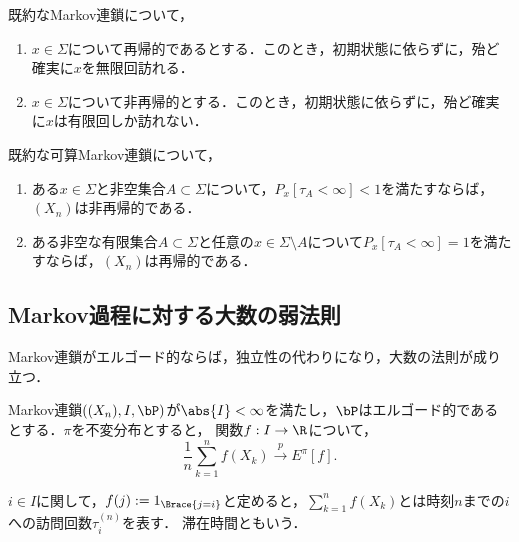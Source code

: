 \documentclass[uplatex,dvipdfmx]{jsreport}
\begin{document}
\begin{proposition}\mbox{}
    既約なMarkov連鎖について，
    \begin{enumerate}
        \item $x\in\Sigma$について再帰的であるとする．このとき，初期状態に依らずに，殆ど確実に$x$を無限回訪れる．
        \item $x\in\Sigma$について非再帰的とする．このとき，初期状態に依らずに，殆ど確実に$x$は有限回しか訪れない．
    \end{enumerate}
\end{proposition}

\begin{proposition}
    既約な可算Markov連鎖について，
    \begin{enumerate}
        \item ある$x\in\Sigma$と非空集合$A\subset\Sigma$について，$P_x[\tau_A<\infty]<1$を満たすならば，$(X_n)$は非再帰的である．
        \item ある非空な有限集合$A\subset\Sigma$と任意の$x\in\Sigma\setminus A$について$P_x[\tau_A<\infty]=1$を満たすならば，$(X_n)$は再帰的である．
    \end{enumerate}
\end{proposition}

\subsection{Markov過程に対する大数の弱法則}

\begin{tcolorbox}[colframe=ForestGreen, colback=ForestGreen!10!white,breakable,colbacktitle=ForestGreen!40!white,coltitle=black,fonttitle=\bfseries\sffamily,
title=]
    Markov連鎖がエルゴード的ならば，独立性の代わりになり，大数の法則が成り立つ．
\end{tcolorbox}

\begin{theorem}[大数の弱法則]\label{thm-law-of-large-number-of-Markov-chain}
    Markov連鎖$((X_n),I,\bP)$が$\abs{I}<\infty$を満たし，$\bP$はエルゴード的であるとする．$\pi$を不変分布とすると，
    関数$f:I\to\R$について，
    \[\frac{1}{n}\sum_{k=1}^nf(X_k)\xrightarrow{p}E^\pi[f].\]
\end{theorem}

\begin{definition}
    $i\in I$に関して，$f(j):=1_{\Brace{j=i}}$と定めると，$\sum^n_{k=1}f(X_k)$とは時刻$n$までの$i$への訪問回数$\tau^{(n)}_i$を表す．
    滞在時間ともいう．
\end{definition}
\end{document}

